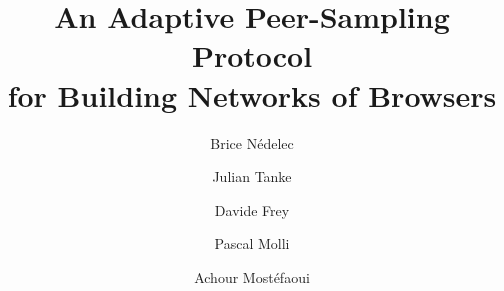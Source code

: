 \documentclass[sigconf]{acmart}
\begin{document}
\title{An Adaptive Peer-Sampling Protocol\\for Building Networks of Browsers}

\newcommand{\affLSNN}{L2SN, University of Nantes\\
  2 rue de la Houssini{\`e}re\\
  BP 92208, 44322 Nantes Cedex 3, France\\
  \url{first.last@univ-nantes.fr}}

\newcommand{\affINRIA}{INRIA Bretagne-Atlantique\\
  Campus Universitaire de Beaulieu \\
  35042 Rennes Cedex, France\\
  \url{davide.frey@inria.fr}}



\author{Brice N{\'e}delec}

\author{Julian Tanke}

\author{Davide Frey}

\author{Pascal Molli}

\author{Achour Most{\'e}faoui}






\maketitle
%


%
%
% 
% 
% 
% 
% 

\clearpage


\clearpage
  
\end{document}

